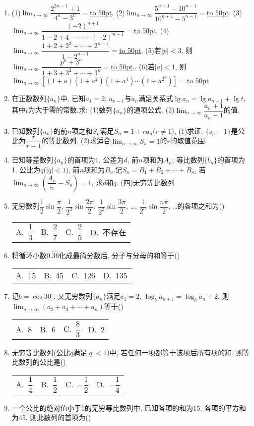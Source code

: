 \documentclass[10pt,a4paper]{article}
\newcommand{\blank}[1]{\underline{\hbox to #1pt{}}}
\newcommand{\fourch}[4]{\par\begin{tabular}{p{.23\textwidth}p{.23\textwidth}p{.23\textwidth}p{.23\textwidth}}
A.~#1 &B.~#2& C.~#3& D.~#4
\end{tabular}}
\begin{document}
\begin{enumerate}[1.]
(2)若$\displaystyle \lim_{n\to \infty} [2-(\dfrac q{1-q})^n]=2$, 则$q$的取值范围是\blank{50}.
(3)若$\displaystyle \lim_{n\to \infty} \dfrac{{x^{2n+1}}}{1+{x^{2n}}}=x$($x\ne 0$), 则$x$的取值范围是\blank{50}.
(4)若$\displaystyle \lim_{n\to \infty} \dfrac{{3^n}+{a^n}}{{3^{n+1}}+{a^{n+1}}}=\dfrac 13$, 则$a$的取值范围是\blank{50}.
\item (1)$\displaystyle \lim_{n\to \infty} \dfrac{{2^{2n-1}}+1}{{4^n}-{3^n}}=$\blank{50}.
(2)$\displaystyle \lim_{n\to \infty} \dfrac{{5^{n+1}}-{{10}^{n-1}}}{{{10}^{n+1}}-{5^{n-1}}}=$\blank{50}.
(3)$\displaystyle \lim_{n\to \infty} \dfrac{{{(-2)}^{n+1}}}{1-2+4-\cdots +{{(-2)}^{n-1}}}=$\blank{50}.
(4)$\displaystyle \lim_{n\to \infty} \dfrac{1+2+{2^2}+\cdots +{2^{n-1}}}{1-{2^{n-1}}}=$\blank{50}.
(5)若$|p|<3$, 则$\displaystyle \lim_{n\to \infty} \dfrac{{p^n}+{3^n}}{1+3+{3^2}+\cdots +{3^n}}=$\blank{50}..
(6)若$|a|<1$, 则$\displaystyle \lim_{n\to \infty} [(1+a)(1+a^2)(1+a^4)\cdots (1+a^{2^n})]=$\blank{50}.
\item 在正数数列$\{a_n\}$中, 已知$a_1=2$, $a_{n-1}$与$a_n$满足关系式$\lg a_n=\lg a_{n-1}+\lg t$, 其中$t$为大于零的常数.求:
(1)数列$\{a_n\}$的通项公式.
(2)$\displaystyle \lim_{n\to \infty} \dfrac{{a_n}+1}{{a_n}-1}$的值.
\item 已知数列$\{a_n\}$的前$n$项之和$S_n$满足$S_n=1+ra_n$($r\ne 1$),
(1)求证: $\{s_n-1\}$是公比为$\dfrac r{r-1}$的等比数列.
(2)求适合$\displaystyle \lim_{n\to \infty} S_n=1$的$r$的取值范围.
\item 已知等差数列$\{a_n\}$的首项为1, 公差为$d$, 前$n$项和为$A_n$; 等比数列$\{b_n\}$的首项为1, 公比为$q$($|q|<1$), 前$n$项和为$B_n$.记$S_n=B_1+B_2+\cdots +B_n$, 若$\displaystyle \lim_{n\to \infty} (\dfrac{A_n}n-S_n)=1$, 求$d$和$q$.
(四)无穷等比数列
\item 无穷数列$\dfrac 12\sin \dfrac{\pi }2$, $\dfrac 1{2^2}\sin \dfrac{2\pi }2$, $\dfrac 1{2^3}\sin \dfrac{3\pi }2$, …, $\dfrac 1{2^n}\sin \dfrac{n\pi }2$, …的各项之和为()
\fourch{$\dfrac 13$}{$\dfrac 27$}{$\dfrac 25$}{不存在}
\item 将循环小数$0.\dot3\dot6$化成最简分数后, 分子与分母的和等于()
\fourch{15}{45}{126}{135}
\item 记$b=\cos 30^\circ$, 又无穷数列$\{a_n\}$满足$a_1=2$, $\log _ba_{n+1}=\log _ba_n+2$, 则$\displaystyle \lim_{n\to \infty} (a_2+a_3+\cdots +a_n)$等于()
\fourch{8}{6}{$\dfrac 83$}{2}
\item 无穷等比数列(公比$q$满足$|q|<1$)中, 若任何一项都等于该项后所有项的和, 则等比数列的公比是()
\fourch{$\dfrac 14$}{$\dfrac 12$}{$-\dfrac 12$}{$-\dfrac 14$}
\item 一个公比的绝对值小于1的无穷等比数列中, 已知各项的和为15, 各项的平方和为45, 则此数列的首项为()

\end{enumerate}
\end{document}
